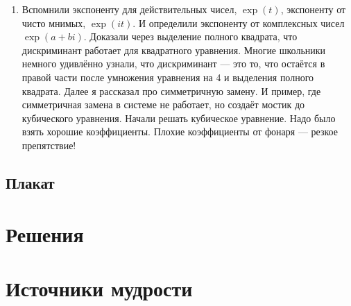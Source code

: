 \documentclass[12pt]{article}
\newcounter{problem}[section]
\theoremstyle{definition}
\begin{document}
\begin{enumerate}
  \item Вспомнили экспоненту для действительных чисел, $\exp(t)$, экспоненту от чисто мнимых, $\exp(it)$. 
  И определили экспоненту от комплексных чисел $\exp(a + bi)$. Доказали через выделение полного квадрата, что дискриминант работает 
  для квадратного уравнения. Многие школьники немного удивлённо узнали, 
  что дискриминант — это то, что остаётся в правой части после умножения уравнения на 4 и выделения полного квадрата. 
  Далее я рассказал про симметричную замену. И пример, где симметричная замена в системе не работает, но создаёт мостик до кубического уравнения. 
  Начали решать кубическое уравнение. Надо было взять хорошие коэффициенты. Плохие коэффициенты от фонаря — резкое препятствие!
 
\end{enumerate}

\subsection{Плакат}






\renewenvironment{solution}[1]{%
         \vskip .5cm plus 2cm minus 0.1cm%
         {\bfseries \hyperlink{problem:#1}{#1.}}%
}%
{%
}%



\section{Решения}



\section{Источники мудрости}

\end{document}
